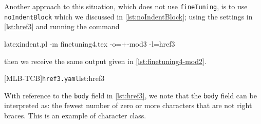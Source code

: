 \documentclass[10pt]{article}
\begin{document}
 \begin{example}
 Another approach to this situation, which does not use \texttt{fineTuning}, is to use
 \texttt{noIndentBlock} which we discussed in \vref{lst:noIndentBlock}; using the
 settings in \cref{lst:href3} and running the command

 \begin{commandshell}
latexindent.pl -m finetuning4.tex -o=+-mod3 -l=href3
\end{commandshell}

 then we receive the same output given in \cref{lst:finetuning4-mod2}.

 [MLB-TCB]{\texttt{href3.yaml}}{lst:href3}

 With reference to the \texttt{body} field in \cref{lst:href3}, we note that the
 \texttt{body} field can be interpreted as: the fewest number of zero or more characters
 that are not right braces. This is an example of character class. 
 \end{example}
\end{document}

